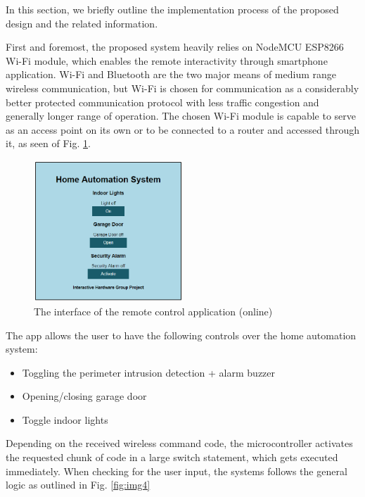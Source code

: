 \documentclass[journal,onecolumn]{IEEEtran}
\begin{document}
In this section, we briefly outline the implementation process of the proposed design and the related information.

First and foremost, the proposed system heavily relies on NodeMCU ESP8266 Wi-Fi module, which enables the remote interactivity through smartphone application. Wi-Fi and Bluetooth are the two major means of medium range wireless communication, but Wi-Fi is chosen for communication as a considerably better protected communication protocol with less traffic congestion and generally longer range of operation. The chosen Wi-Fi module is capable to serve as an access point on its own or to be connected to a router and accessed through it, as seen of Fig. \ref{fig:img3}.

\begin{figure}[H]
  \includegraphics[width=0.5\textwidth]{img/img3.png}
  \caption{The interface of the remote control application (online)}
  \label{fig:img3}
\end{figure}

The app allows the user to have the following controls over the home automation system:
\begin{itemize}
	\item{Toggling the perimeter intrusion detection + alarm buzzer}
	\item{Opening/closing garage door}
	\item{Toggle indoor lights}
\end{itemize}

Depending on the received wireless command code, the microcontroller activates the requested chunk of code in a large switch statement, which gets executed immediately. When checking for the user input, the systems follows the general logic as outlined in Fig. \ref{fig:img4}
\end{document}
